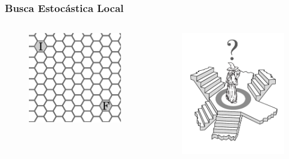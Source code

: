 \documentclass[10pt, compress]{beamer}
\begin{document}
\begin{frame}[fragile]
    \frametitle{Busca Estocástica Local}
    \begin{columns}
        \centering
        \begin{figure}[h]
            \centering
            \includegraphics[width=1\textwidth]{hex_map}
        \end{figure}
        \centering
        \begin{figure}[h]
            \centering
            \includegraphics[width=1\textwidth]{gandalfsearch}

\end{figure}
\end{columns}
\end{frame}
\end{document}
